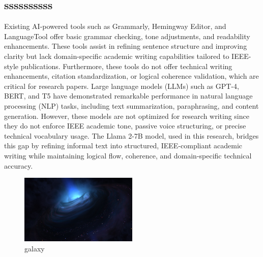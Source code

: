 \documentclass[conference]{IEEEtran}
\begin{document}
      \subsection{ssssssssss}
      Existing AI-powered tools such as Grammarly, Hemingway Editor, and LanguageTool offer basic grammar checking, tone adjustments, and readability enhancements. These tools assist in refining sentence structure and improving clarity but lack domain-specific academic writing capabilities tailored to IEEE-style publications. Furthermore, these tools do not offer technical writing enhancements, citation standardization, or logical coherence validation, which are critical for research papers.
Large language models (LLMs) such as GPT-4, BERT, and T5 have demonstrated remarkable performance in natural language processing (NLP) tasks, including text summarization, paraphrasing, and content generation. However, these models are not optimized for research writing since they do not enforce IEEE academic tone, passive voice structuring, or precise technical vocabulary usage. The Llama 2-7B model, used in this research, bridges this gap by refining informal text into structured, IEEE-compliant academic writing while maintaining logical flow, coherence, and domain-specific technical accuracy.

\begin{figure}[h]
\centering
\includegraphics[width=0.5\textwidth]{..//uploads/1740310754251.jpg}
\caption{galaxy}
\end{figure}


    
  
\end{document}
